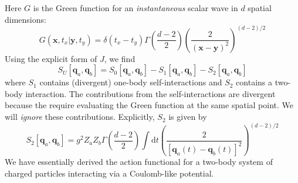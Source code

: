 Here $G$ is the Green function for an \textit{instantaneous} scalar wave in $d$ spatial dimensions:
\begin{equation}
	G(\mathbf{x}, t_{x}| \mathbf{y}, t_{y}) = \delta(t_{x} - t_{y}) \Gamma\left( \frac{d - 2}{2} \right) \left( \frac{2}{(\mathbf{x} - \mathbf{y})^{2}} \right)^{(d - 2)/2}
\end{equation}
Using the explicit form of $J$, we find
\begin{equation}
	S_{U}[ \mathbf{q}_{a}, \mathbf{q}_{b}] = S_{0}[ \mathbf{q}_{a}, \mathbf{q}_{b}] - S_{1}[ \mathbf{q}_{a}, \mathbf{q}_{b} ] - S_{2}[ \mathbf{q}_{a}, \mathbf{q}_{b} ]
\end{equation}
where $S_{1}$ contains (divergent) one-body self-interactions and $S_{2}$ contains a two-body interaction. The contributions from the self-interactions are divergent because the require evaluating the Green function at the same spatial point. We will \textit{ignore} these contributions. Explicitly, $S_{2}$ is given by
\begin{equation}
	S_{2}[ \mathbf{q}_{a}, \mathbf{q}_{b} ] = g^{2} Z_{a} Z_{b} \Gamma\left( \frac{d - 2}{2} \right) \int \mathrm{d}t \left( \frac{2}{[\mathbf{q}_{a}(t) - \mathbf{q}_{b}(t)]^{2}} \right)^{(d - 2)/2}
\end{equation}
We have essentially derived the action functional for a two-body system of charged particles interacting via a Coulomb-like potential.

